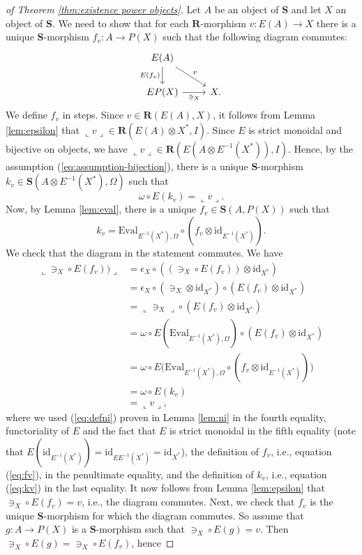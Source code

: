 \documentclass[12pt]{tac}
\theoremstyle{definition}
\theoremstyle{remark}
\newcommand{\<}{\langle}
\renewcommand{\>}{\rangle}
\renewcommand{\:}{\colon}
\newcommand{\Eval}{\mathrm{Eval}}
\newcommand{\id}{\mathrm{id}}
\newcommand{\coname}[1]{\llcorner #1\lrcorner}
\begin{document}
\begin{proof}[of Theorem \ref{thm:existence power objects}]
    Let $A$ be an object of $\mathbf S$ and let $X$ an object of $\mathbf S$. We need to show that for  each $\mathbf R$-morphism $v:E(A)\to X$ there is a unique $\mathbf S$-morphism $f_v:A\to P(X)$ such that the following diagram commutes:
    \[\begin{tikzcd}
E(A)\ar{rd}{v}\ar{d}[swap]{E(f_v)} & \\
EP(X)\ar{r}[swap]{\ni_X} & X.
\end{tikzcd}\]
    We define $f_v$ in steps. Since $v\in\mathbf R(E(A),X)$, it follows from Lemma \ref{lem:epsilon} that $\coname{v}\in\mathbf R(E(A)\otimes X^*,I)$. Since $E$ is strict monoidal and bijective on objects, we have $\coname{v}\in \mathbf R(E(A\otimes E^{-1}(X^*)),I)$. Hence, by the assumption (\ref{eq:assumption-bijection}), there is a unique $\mathbf S$-morphism $k_v\in \mathbf S(A\otimes E^{-1}(X^*),\Omega)$ such that 
    \begin{equation}\label{eq:kv}
    \omega\circ E(k_v)= \coname{v}.
    \end{equation}
    Now, by Lemma \ref{lem:eval}, there is a unique $f_v\in\mathbf S(A,P(X))$ such that
    \begin{equation}\label{eq:fv}
    k_v=\Eval_{E^{-1}(X^*),\Omega}\circ (f_v\otimes \id_{E^{-1}(X^*)}).
    \end{equation}
    We check that the diagram in the statement commutes.
We have
\begin{align*} 
\coname{\ni_X\circ E(f_v))} & = \epsilon_X\circ( (\ni_X\circ E(f_v))\otimes \id_{X^*})\\
& =
\epsilon_X\circ(\ni_X\otimes \id_{X^*})\circ(E(f_v)\otimes \id_{X^*})\\
& = \coname{\ni_X}\circ (E(f_v)\otimes\id_{X^*})\\
& = \omega\circ E(\Eval_{E^{-1}(X^*),\Omega})\circ (E(f_v)\otimes \id_{X^*})\\
& = \omega\circ E\big(\Eval_{E^{-1}(X^*),\Omega}\circ (f_v\otimes \id_{E^{-1}(X^*)})\big)\\
& = \omega\circ E(k_v)\\
&= \coname{v},
\end{align*}
where we used (\ref{eq:defni}) proven in Lemma \ref{lem:ni} in the fourth equality, functoriality of $E$ and the fact that $E$ is strict monoidal in the fifth equality (note that $E(\id_{E^{-1}(X^*)})=\id_{EE^{-1}(X^*)}=\id_{X^*}$), the definition of $f_v$, i.e., equation (\ref{eq:fv}), in the penultimate equality, and the definition of $k_v$, i.e., equation (\ref{eq:kv}) in the last equality. It now follows from Lemma \ref{lem:epsilon} that $\ni_X\circ E(f_v)=v$, i.e., the diagram commutes. Next, we check that $f_v$ is the unique $\mathbf S$-morphism for which the diagram commutes. So assume that $g:A\to P(X)$ is a $\mathbf S$-morphism such that $\ni_X\circ E(g)=v$. Then $\ni_X\circ E(g)=\ni_X\circ E(f_v)$, hence     

\end{proof}
\end{document}
